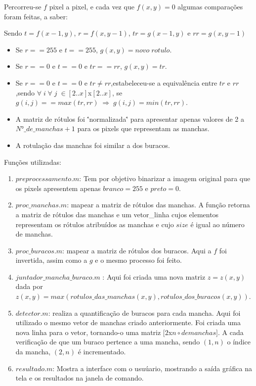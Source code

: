 \documentclass[conference]{IEEEtran}
\begin{document}
Percorreu-se $f $ pixel a pixel, e cada vez que $f(x,y)=0$ algumas compara\c{c}\~oes foram feitas, a saber:

Sendo $t=f(x-1,y )$, $r=f(x,y-1) $, $tr=g(x-1,y) $ e $rr=g(x,y-1)$
\begin{itemize}
	\item Se $ r==255 $ e  $t==255 $, $g(x,y)=novo\;rotulo$.
	\item Se $ r==0 $ e  $t==0 $ e $tr==rr$, $g(x,y)=tr$.
	\item  Se $ r==0 $ e  $t==0 $ e $tr\neq rr$,estabeleceu-se a equival\^encia entre $tr $ e $rr$,sendo  $\forall\;i\;\forall\;j\;\in [2 .. x]$x$[2 .. x] $, se $g(i,j)== max(tr,rr)\;\Rightarrow\;g(i,j)= min(tr,rr) $.
	\item A matriz de r\'otulos foi \''normalizada\'' para apresentar apenas valores de 2 a $N°\_de\_manchas +1$ para os pixels que representam as manchas.
	\item A rotula\c{c}\~ao das manchas foi similar a dos buracos.
\end{itemize}
\vspace{2\baselineskip}\vspace{-\parskip}
Fun\c{c}\~oes utilizadas:
\vspace{2\baselineskip}\vspace{-\parskip}
\begin{enumerate}
	 \item $preprocessamento.m$: Tem por objetivo binarizar a imagem original para que os pixels apresentem apenas $branco=255 $ e $ preto=0$.
  	\item $proc\_manchas.m$: mapear a matriz de r\'otulos das manchas. A fun\c{c}\~ao retorna a matriz de r\'otulos das manchas e um vetor\_linha cujos elementos representam os r\'otulos atribu\'idos as manchas e cujo $size $ \'e igual ao n\'umero de manchas.
  	\item $proc\_buracos.m$: mapear a matriz de r\'otulos dos buracos. Aqui a $f$ foi invertida, assim como a $g$ e o mesmo processo foi feito.
  	\item $juntador\_mancha\_buraco.m$ : Aqui foi criada uma nova matriz $z=z(x,y) $ dada por $z(x,y)=max(rotulos\_das\_manchas(x,y),rotulos\_dos\_buracos(x,y))$.
  	\item $detector.m$: realiza a quantifica\c{c}\~ao de buracos para cada mancha. Aqui foi utilizado o mesmo vetor de manchas criado anteriormente. Foi criada uma nova linha para o vetor, tornando-o uma matriz $[2 $x$n\circ de manchas]$. A cada verifica\c{c}\~ao de que um buraco pertence a uma mancha, sendo $(1,n) $ o \'indice da mancha,   $(2,n) $ \'e incrementado.
  	\item $resultado.m$: Mostra a interface com o usu\'uario, mostrando a sa\'ida gr\'afica na tela e os resultados na janela de comando.
  	
\end{enumerate}
\end{document}

